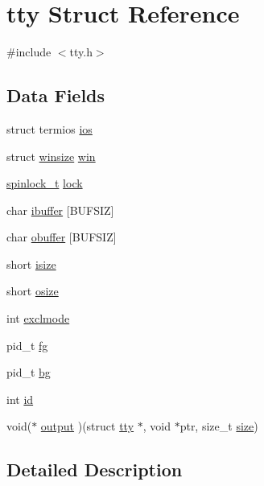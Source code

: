 \hypertarget{structtty}{\section{tty Struct Reference}
\label{structtty}
}


{\ttfamily \#include $<$tty.\+h$>$}

\subsection*{Data Fields}
\begin{DoxyCompactItemize}
\item 
struct termios \hyperlink{structtty_a10958fdd6a24123e3522b806a8647656}{ios}
\item 
struct \hyperlink{grub_8h_a75544d53f0c0032654ba8afc5ea4fb34}{winsize} \hyperlink{structtty_af7fc07d18ca858dc99376525b8a437a3}{win}
\item 
\hyperlink{spinlock_8h_a7d562148dafb0dacf0ee876d482ed090}{spinlock\+\_\+t} \hyperlink{structtty_a37c81cc0b682d67ec3d789f061357d77}{lock}
\item 
char \hyperlink{structtty_ad876c12571c56724c3277ee634b5dd30}{ibuffer} \mbox{[}B\+U\+F\+S\+I\+Z\mbox{]}
\item 
char \hyperlink{structtty_a739b6ee550a2f4f997637261aed60167}{obuffer} \mbox{[}B\+U\+F\+S\+I\+Z\mbox{]}
\item 
short \hyperlink{structtty_a25ab11cf5b7109480eb6f2e4f05efe4f}{isize}
\item 
short \hyperlink{structtty_a94aa6d24908c6976459d187842f1428b}{osize}
\item 
int \hyperlink{structtty_aeb81a44fe3a7067e36a6c2c9194d8dad}{exclmode}
\item 
pid\+\_\+t \hyperlink{structtty_a8a6dae366ed6eac05de7d9d463bd04eb}{fg}
\item 
pid\+\_\+t \hyperlink{structtty_a68f717ba40f28d6b941f62f0e7255e2e}{bg}
\item 
int \hyperlink{structtty_ababbf2910aa51f41da438d6adca0aca5}{id}
\item 
void($\ast$ \hyperlink{structtty_a2a619877d6ee5bb7caa115a931f98e2c}{output} )(struct \hyperlink{structtty}{tty} $\ast$, void $\ast$ptr, size\+\_\+t \hyperlink{mm_8c_a854352f53b148adc24983a58a1866d66}{size})
\end{DoxyCompactItemize}


\subsection{Detailed Description}


